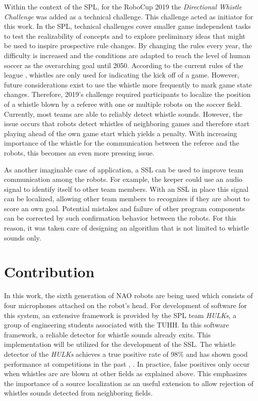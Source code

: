 Within the context of the \ac{SPL}, for the \ac{RoboCup} 2019 the \textit{Directional
Whistle Challenge} was added as a technical challenge. This challenge acted as
initiator for this work. In the \ac{SPL}, technical challenges cover smaller
game independent tasks to test the realizability of concepts and to explore
preliminary ideas that might be used to inspire prospective rule changes. By
changing the rules every year, the difficulty is increased and the conditions
are adapted to reach the level of human soccer as the overarching goal until
2050. According to the current rules of the league \cite{rules},
whistles are only used for indicating the kick off of a game. However,
future considerations exist to use the whistle more frequently to mark
game state changes. Therefore, 2019's challenge required participants to
localize the position of a whistle blown by a referee with one or
multiple robots on the soccer field.
Currently, most teams are able to reliably detect whistle sounds. However, the
issue occurs that robots detect whistles of neighboring games and therefore
start playing ahead of the own game start which yields a penalty. With
increasing importance of the whistle for the communication between the referee
and the robots, this becomes an even more pressing issue.

As another imaginable case of application, a \ac{SSL} can be used to improve team
communication among the robots.
For example, the keeper could use an audio signal to identify itself to other team
members. With an \ac{SSL} in place this signal can be localized, allowing other
team members to recognizes if they are about to score an own goal.
Potential mistakes and failure of other program components can be corrected by such
confirmation behavior between the robots.
For this reason, it was taken care of designing an algorithm that is not
limited to whistle sounds only.

\section{Contribution}
\label{sec:01_contribution}

In this work, the sixth generation of NAO robots are being used
which consists of four microphones attached on the robot's head.
For development of software for this system, an extensive framework is provided by
the \ac{SPL} team \textit{HULKs}, a group of engineering students associated
with the \ac{TUHH}.
In this software framework, a reliable detector for whistle sounds already exits.
This implementation will be utilized for the development of the \ac{SSL}. The
whistle detector of the \textit{HULKs} achieves a true positive rate of 98\si{\percent}
and has shown good performance at competitions in the past \cite{Hasselbring}, \cite{statistics}.
In practice, false positives only occur when whistles are are blown
at other fields as explained above. This emphasizes the importance of
a source localization as an useful extension to allow rejection of whistles
sounds detected from neighboring fields.

